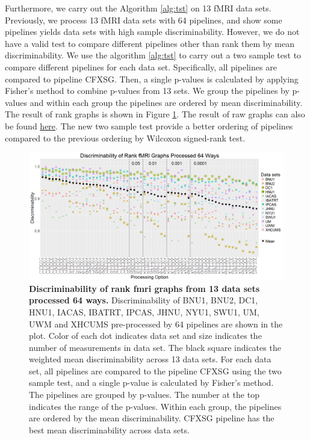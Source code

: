 \documentclass[simplex.tex]{subfiles}
\begin{document}
Furthermore, we carry out the Algorithm \ref{alg:tst} on 13 fMRI data sets. Previously, we process 13 fMRI data sets with 64 pipelines, and show some pipelines yields data
sets with high sample discriminability. However, we do not have a valid test to compare different pipelines other than rank them by mean discriminability. We use the algorithm \ref{alg:tst} to carry out a two sample test to compare different pipelines for each data set. Specifically, all pipelines are compared to pipeline CFXSG. Then, a single p-values is calculated by applying Fisher's method to combine p-values from 13 sets. We group the pipelines by p-values and within each group the pipelines are ordered by mean discriminability. The result of rank graphs is shown in Figure \ref{fig:pipes}. The result of raw graphs can also be found \href{http://github.com/neurodata/discriminability}{here}. The new two sample test provide a better ordering of pipelines compared to the previous ordering by Wilcoxon signed-rank test. 

\begin{figure}[h!]
	\begin{cframed}
		\centering
		\includegraphics[width=\textwidth]{../../figs/fmri_rank_pv_v2.png}
		\caption{
			{\bf Discriminability of rank fmri graphs from 13 data sets processed 64 ways.}  Discriminability of BNU1, BNU2, DC1, HNU1, IACAS, IBATRT, IPCAS, JHNU, NYU1, SWU1, UM, UWM and XHCUMS pre-processed by 64 pipelines are shown in the plot. Color of each dot indicates data set and size indicates the number of measurements in data set. The black square indicates the weighted mean discriminability across 13 data sets.  For each data set, all pipelines are compared to the pipeline CFXSG using the two sample test, and a single p-value is calculated by Fisher's method. The pipelines are grouped by p-values. The number at the top indicates the range of the p-values. Within each group, the pipelines are ordered by the mean discriminability. CFXSG pipeline has the best mean discriminability across data sets.}
		\label{fig:pipes}
	\end{cframed}
\end{figure}
\end{document}
